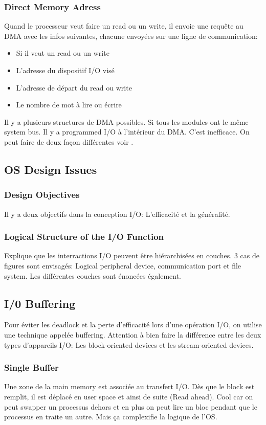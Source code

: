 \subsubsection{Direct Memory Adress}
Quand le processeur veut faire un read ou un write, il envoie une requête au DMA avec les infos suivantes, chacune envoyées sur une ligne de communication:
\begin{itemize}
  \item Si il veut un read ou un write
  \item L'adresse du dispositif I/O visé
  \item L'adresse de départ du read ou write
  \item Le nombre de mot à lire ou écrire
\end{itemize}
Il y a plusieurs structures de DMA possibles.
Si tous les modules ont le même system bus.
Il y a programmed I/O à l'intérieur du DMA.
C'est inefficace.
On peut faire de deux façon différentes voir \cite[p.~500]{stallings}.

\subsection{OS Design Issues}

\subsubsection{Design Objectives}
Il y a deux objectifs dans la conception I/O: L'efficacité et la généralité.

\subsubsection{Logical Structure of the I/O Function}
Explique que les interractions I/O peuvent être hiérarchisées en couches.
3 cas de figures sont envisagés: Logical peripheral device, communication port et file system.
Les différentes couches sont énoncées également.

\subsection{I/0 Buffering}
Pour éviter les deadlock et la perte d'efficacité lors d'une opération I/O, on utilise une technique appelée buffering.
Attention à bien faire la différence entre les deux types d'appareils I/O: Les block-oriented devices et les stream-oriented devices.

\subsubsection{Single Buffer}
Une zone de la main memory est associée au transfert I/O.
Dès que le block est remplit, il est déplacé en user space et ainsi de suite (Read ahead).
Cool car on peut swapper un processus dehors et en plus on peut lire un bloc pendant que le processus en traite un autre.
Mais ça complexifie la logique de l'OS.

